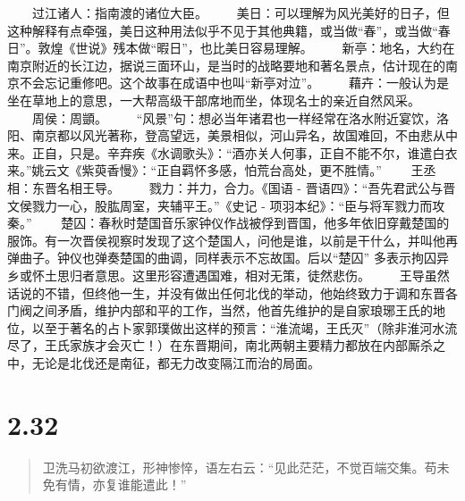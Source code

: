 \documentclass[]{book}
\begin{document}
　　过江诸人：指南渡的诸位大臣。
　　美日：可以理解为风光美好的日子，但这种解释有点牵强，美日这种用法似乎不见于其他典籍，或当做``春''，或当做``春日''。敦煌《世说》残本做``暇日''，也比美日容易理解。
　　新亭：地名，大约在南京附近的长江边，据说三面环山，是当时的战略要地和著名景点，估计现在的南京不会忘记重修吧。这个故事在成语中也叫``新亭对泣''。
　　藉卉：一般认为是坐在草地上的意思，一大帮高级干部席地而坐，体现名士的亲近自然风采。
　　周侯：周顗。
　　``风景''句：想必当年诸君也一样经常在洛水附近宴饮，洛阳、南京都以风光著称，登高望远，美景相似，河山异名，故国难回，不由悲从中来。正自，只是。辛弃疾《水调歌头》：``酒亦关人何事，正自不能不尔，谁遣白衣来。''姚云文《紫萸香慢》：``正自羁怀多感，怕荒台高处，更不胜情。''
　　王丞相：东晋名相王导。 　　戮力：并力，合力。《国语 -
晋语四》：``吾先君武公与晋文侯戮力一心，股肱周室，夹辅平王。''《史记 -
项羽本纪》：``臣与将军戮力而攻秦。''
　　楚囚：春秋时楚国音乐家钟仪作战被俘到晋国，他多年依旧穿戴楚国的服饰。有一次晋侯视察时发现了这个楚国人，问他是谁，以前是干什么，并叫他再弹曲子。钟仪也弹奏楚国的曲调，同样表示不忘故国。后以``楚囚''
多表示拘囚异乡或怀土思归者意思。这里形容遭遇国难，相对无策，徒然悲伤。
　　王导虽然话说的不错，但终他一生，并没有做出任何北伐的举动，他始终致力于调和东晋各门阀之间矛盾，维护内部和平的工作，当然，他首先维护的是自家琅琊王氏的地位，以至于著名的占卜家郭璞做出这样的预言：``淮流竭，王氏灭''（除非淮河水流尽了，王氏家族才会灭亡！）在东晋期间，南北两朝主要精力都放在内部厮杀之中，无论是北伐还是南征，都无力改变隔江而治的局面。　

\section{2.32}\label{section-78}

\begin{quote}
卫洗马初欲渡江，形神惨悴，语左右云：``见此茫茫，不觉百端交集。苟未免有情，亦复谁能遣此！''
\end{quote}
\end{document}

